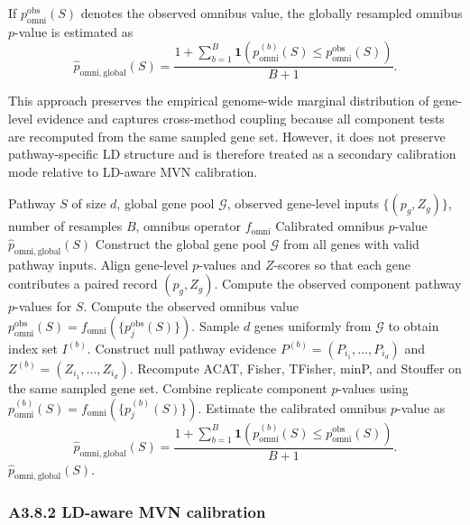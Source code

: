 \documentclass[unnumsec,webpdf,contemporary,large]{oup-authoring-template}%
\theoremstyle{thmstyleone}%
\theoremstyle{thmstyletwo}%
\theoremstyle{thmstylethree}%
\begin{document}
\begin{appendices}
If $p_{\mathrm{omni}}^{\mathrm{obs}}(S)$ denotes the observed omnibus value, the globally resampled omnibus $p$-value is estimated as
\[
\hat p_{\mathrm{omni,global}}(S)
=
\frac{
1+\sum_{b=1}^{B}
\mathbf{1}\!\left(
p_{\mathrm{omni}}^{(b)}(S)
\le
p_{\mathrm{omni}}^{\mathrm{obs}}(S)
\right)
}{
B+1
}.
\]

This approach preserves the empirical genome-wide marginal distribution of gene-level evidence and captures cross-method coupling because all component tests are recomputed from the same sampled gene set. However, it does not preserve pathway-specific LD structure and is therefore treated as a secondary calibration mode relative to LD-aware MVN calibration.

\begin{algorithm}[htbp]
\caption{Global gene-set resampling calibration for pathway $S$}
\label{alg:global_resampling}
\begin{algorithmic}[1]
\Require Pathway $S$ of size $d$, global gene pool $\mathcal{G}$, observed gene-level inputs $\{(p_g,Z_g)\}$, number of resamples $B$, omnibus operator $f_{\mathrm{omni}}$
\Ensure Calibrated omnibus $p$-value $\hat p_{\mathrm{omni,global}}(S)$
\State Construct the global gene pool $\mathcal{G}$ from all genes with valid pathway inputs.
\State Align gene-level $p$-values and $Z$-scores so that each gene contributes a paired record $(p_g,Z_g)$.
\State Compute the observed component pathway $p$-values for $S$.
\State Compute the observed omnibus value $p_{\mathrm{omni}}^{\mathrm{obs}}(S)=f_{\mathrm{omni}}\!\left(\{p_j^{\mathrm{obs}}(S)\}\right)$.
    \State Sample $d$ genes uniformly from $\mathcal{G}$ to obtain index set $I^{(b)}$.
    \State Construct null pathway evidence $P^{(b)}=(P_{i_1},\dots,P_{i_d})$ and $Z^{(b)}=(Z_{i_1},\dots,Z_{i_d})$.
    \State Recompute ACAT, Fisher, TFisher, minP, and Stouffer on the same sampled gene set.
    \State Combine replicate component $p$-values using $p_{\mathrm{omni}}^{(b)}(S)=f_{\mathrm{omni}}\!\left(\{p_j^{(b)}(S)\}\right)$.
\EndFor
\State Estimate the calibrated omnibus $p$-value as
\[
\hat p_{\mathrm{omni,global}}(S)
=
\frac{
1+\sum_{b=1}^{B}
\mathbf{1}\!\left(
p_{\mathrm{omni}}^{(b)}(S)
\le
p_{\mathrm{omni}}^{\mathrm{obs}}(S)
\right)
}{
B+1
}.
\]
\State \Return $\hat p_{\mathrm{omni,global}}(S)$.
\end{algorithmic}
\end{algorithm}

\subsubsection{A3.8.2 LD-aware MVN calibration}


\end{appendices}
\end{document}
